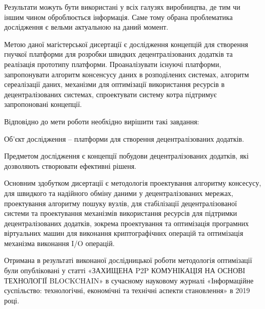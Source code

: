 \documentclass{lib/styles/default-style}
\begin{document}
    Результати можуть бути використані у всіх галузях виробництва, де тим чи іншим чином оброблюється інформація.
    Саме тому обрана проблематика дослідження є вельми актуальною на даний момент.

    Метою даної магістерської дисертації є дослідження концепцій для створення гнучкої платформи для розробки швидких децентралізованих додатків
    та реалізація прототипу платформи. Проаналізувати існуючі платформи, запропонувати алгоритм консенсусу  даних  в  розподілених  системах,
    алгоритм сереалізації даних, механізми для оптимізації використання ресурсів в децентралізованих системах,
    спроектувати  систему  котра  підтримує запропоновані концепції.

    Відповідно до мети роботи необхідно вирішити такі завдання:

    Об'єкт дослідження – платформи для створення децентралізованих додатків.

    Предметом дослідження є концепції побудови децентралізованих додатків, які дозволяють створювати ефективні рішеня.

    Основним здобутком дисертації є методологія проектування алгоритму консесусу, для
    швидкого та надійного обміну даними у децентралізованих мережах,
    проектування алгоритму пошуку вузлів, для стабілізації децентралізованої системи та
    проектування механізмів використання ресурсів для підтримки децентралізованих додатків, зокрема
    проектування та оптимізація програмних віртуальних машин для виконання криптографічних операцій
    та оптимізація механізма виконання I/O операцій. 

    Отримана в результаті виконаної дослідницької роботи методологія
    оптимізації були опубліковані у статті «ЗАХИЩЕНА P2P КОМУНІКАЦІЯ НА ОСНОВІ ТЕХНОЛОГІЇ BLOCKCHAIN» в
    сучасному науковому журналі «Інформаційне суспільство: технологічні,
    економічні та технічні аспекти становлення» в 2019 році.

\end{document}
